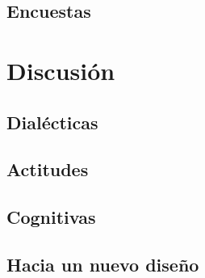 \documentclass[12pt,spanish,]{book}
\begin{document}
\hypertarget{encuestas}{%
\section{Encuestas}\label{encuestas}}

\hypertarget{discusiuxf3n}{%
\chapter{Discusión}\label{discusiuxf3n}}

\hypertarget{dialuxe9cticas-1}{%
\section{Dialécticas}\label{dialuxe9cticas-1}}

\hypertarget{actitudes-1}{%
\section{Actitudes}\label{actitudes-1}}

\hypertarget{cognitivas}{%
\section{Cognitivas}\label{cognitivas}}

\hypertarget{hacia-un-nuevo-diseuxf1o}{%
\section{Hacia un nuevo diseño}\label{hacia-un-nuevo-diseuxf1o}}


\end{document}
